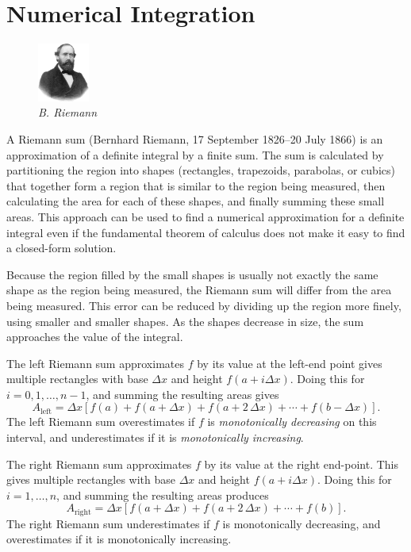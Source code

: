 \section{Numerical Integration}

\begin{figure}
  \begin{center}
\includegraphics[width=0.15\textwidth]{images/riemann.png} \\
\emph{B.\xspace Riemann}
  \end{center}
\end{figure}

A Riemann sum (Bernhard Riemann, 17 September 1826--20 July 1866) is an
approximation of a definite integral by a finite sum. The sum is calculated by
partitioning the region into shapes (rectangles, trapezoids, parabolas, or
cubics) that together form a region that is similar to the region being
measured, then calculating the area for each of these shapes, and finally
summing these small areas. This approach can be used to find a numerical
approximation for a definite integral even if the fundamental theorem of
calculus does not make it easy to find a closed-form solution.

Because the region filled by the small shapes is usually not exactly the
same shape as the region being measured, the Riemann sum will differ
from the area being measured. This error can be reduced by dividing up
the region more finely, using smaller and smaller shapes. As the shapes
decrease in size, the sum approaches the value of the integral.

The left Riemann sum approximates $f$ by its value at the
left-end point gives multiple rectangles with base $\Delta x$ and height
$f(a + i\Delta x)$. Doing this for $i = 0, 1, \ldots , n-1$, and summing
the resulting areas gives
$$
A_\text{left} =
\Delta x \left[f(a) + f(a + \Delta x) + f(a+ 2 \, \Delta x)+ \cdots+f(b - \Delta x)\right].
$$
The left Riemann sum overestimates if $f$ is
\emph{monotonically decreasing} on this interval, and underestimates
if it is \emph{monotonically increasing}.

The right Riemann sum approximates $f$ by its value at the
right end-point. This gives
multiple rectangles with base $\Delta x$ and height $f(a + i\Delta x)$.
Doing this for $i = 1, \ldots, n$, and summing the resulting areas
produces
$$
A_\text{right} = \Delta x \left[ f( a
+ \Delta x ) + f(a + 2 \, \Delta x)+\cdots+f(b) \right].
$$
The right Riemann sum underestimates if $f$ is
monotonically decreasing, and overestimates if it is monotonically
increasing.


